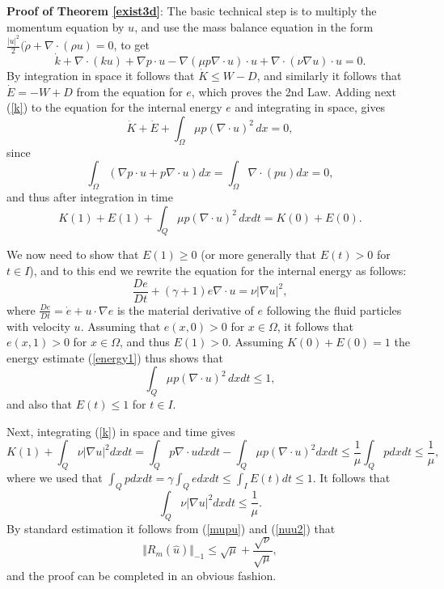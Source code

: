 \medskip
\noindent 
{\bf Proof of Theorem \ref{exist3d}}: 
The basic technical step is to multiply the momentum equation
by $u$, and use the mass balance equation in the form
$\frac{\vert u\vert^2}{2}(\dot \rho +\nabla\cdot (\rho u)=0$, to get
\begin{equation}\label{k}
\dot k +\nabla\cdot (ku)+\nabla p\cdot u -\nabla (\mu p\nabla\cdot u)\cdot u+ 
\nabla\cdot (\nu \nabla u)\cdot u =0.
\end{equation}
By integration in space it follows that $\dot K\le W-D$,
and similarly it follows that $\dot E =-W+D$ from the 
equation for $e$, which proves the 2nd Law.
Adding next (\ref{k}) to the equation for the internal energy $e$ and
integrating in space, gives
\[
\dot K+\dot E +\int_\Omega \mu p(\nabla\cdot u)^2\, dx =0,
\]
since
\[
\int_\Omega (\nabla p\cdot u + p\nabla\cdot u)dx = \int_\Omega \nabla\cdot (pu) dx =0,
\] 
and thus after integration in time
\begin{equation}\label{energy1}
K(1)+E(1) +\int_Q \mu p(\nabla\cdot u)^2\, dxdt =K(0)+E(0).
\end{equation}

We now need to show that $E(1)\ge 0$ (or more generally that $E(t)>0$
for $t\in I$), and to this end we
rewrite the equation for the internal energy as follows:
\[
\frac{De}{Dt} +(\gamma +1) e\nabla\cdot u=  \nu \vert\nabla u\vert^2,
\]
where $\frac{De}{Dt}=\dot e+u\cdot\nabla e$ is the material derivative
of $e$ following the fluid particles with velocity $u$.
 Assuming that $e(x,0)> 0$ for
$x\in\Omega $, it follows
that $e(x,1)>0$ for $x\in\Omega$, and thus $E(1)>0$.
Assuming $K(0)+E(0)=1$ the energy estimate 
(\ref{energy1}) thus shows that
\begin{equation}\label{mupu}
\int_Q\mu p(\nabla\cdot u )^2\, dxdt \le 1,
\end{equation}
and also that $E(t)\le 1$ for $t\in I$.

Next, integrating (\ref{k}) in space and time gives
\[
K(1)+\int_Q\nu\vert\nabla u\vert^2dxdt=\int_Q p\nabla\cdot udxdt -
\int_Q\mu p(\nabla\cdot u)^2dxdt \le \frac{1}{\mu}\int_Qpdxdt\le \frac{1}{\mu},
\]
where we used that $\int_Q p dxdt=\gamma \int_Qedxdt \le \int_IE(t)dt\le 1$. It follows that
\begin{equation}\label{nuu2}
\int_Q\nu\vert\nabla u\vert^2dxdt\le \frac{1}{\mu}.
\end{equation}
By standard estimation it follows from (\ref{mupu}) and (\ref{nuu2}) that
\[
\Vert R_m(\hat u)\Vert_{-1}\le \sqrt{\mu}+\frac{\sqrt{\nu}}{\sqrt{\mu}},
\]
and the proof can be completed in an obvious fashion.

